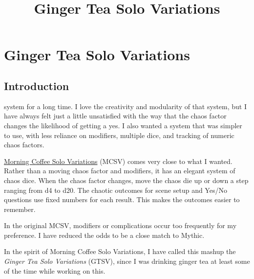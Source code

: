 

\title{
\Huge{Ginger Tea Solo Variations}
}


\onecolumn
\frontmatter{}

\mainmatter{}

\chapter*{Ginger Tea Solo Variations \version}

\section{Introduction}
system for a long time. I love the creativity and modularity of that system,
but I have always felt just a little unsatisfied with the way that the chaos
factor changes the likelihood of getting a yes. I also wanted a system
that was simpler to use, with less reliance on modifiers, multiple dice, and
tracking of numeric chaos factors.

\href{https://aleaiactandaest.blogspot.com/p/downloads.html}{Morning Coffee Solo
Variations} (MCSV) comes very close to what I wanted. Rather than a moving chaos
factor and modifiers, it has an elegant system of chaos dice. When the chaos
factor changes, move the chaos die up or down a step ranging from d4 to d20. The
chaotic outcomes for scene setup and Yes/No questions use fixed numbers for each
result. This makes the outcomes easier to remember.

In the original MCSV, modifiers or complications occur too frequently for my
preference. I have reduced the odds to be a close match to Mythic.

In the spirit of Morning Coffee Solo Variations, I have called this mashup the
\emph{Ginger Tea Solo Variations} (GTSV), since I was drinking ginger tea at
least some of the time while working on this.

